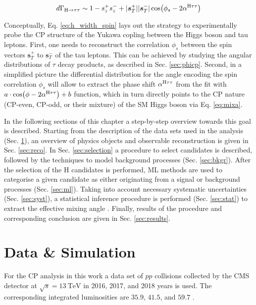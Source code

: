 \begin{equation}\label{eq:h_width_spin}
    d\Gamma_{\text{H} \rightarrow \tau\tau} \sim 1 - s^+_zs^-_z + |\boldsymbol{s}_T^+||\boldsymbol{s}_T^-|\cos(\phi_{s}-2\alpha^{\text{H}\tau\tau})
\end{equation}

Conceptually, Eq. \ref{eq:h_width_spin} lays out the strategy to experimentally probe the CP structure of the Yukawa copling between the Higgs boson and tau leptons. First, one needs to reconstruct the correlation $\phi_{s}$ between the spin vectors $\boldsymbol{s}_T^+$ to $\boldsymbol{s}_T^-$ of the tau leptons. This can be achieved by studying the angular distributions of $\tau$ decay products, as described in Sec. \ref{sec:phicp}. Second, in a simplified picture the differential distribution for the angle encoding the spin correlation $\phi_{s}$ will allow to extract the phase shift $\alpha^{\text{H}\tau\tau}$ from the fit with $a\cdot\cos(\phi - 2\alpha^{\text{H}\tau\tau})+b$ function, which in turn directly points to the CP nature (CP-even, CP-odd, or their mixture) of the SM Higgs boson via Eq. \ref{eq:mixa}. 

In the following sections of this chapter a step-by-step overview towards this goal is described. Starting from the description of the data sets used in the analysis (Sec. \ref{sec:samples}), an overview of physics objects and observable reconstruction is given in Sec. \ref{sec:reco}. In Sec. \ref{sec:selection} a procedure to select \htt candidates is described, followed by the techniques to model background processes (Sec. \ref{sec:bkgr}). After the selection of the H candidates is performed, ML methods are used to categorise a given candidate as either originating from a signal or background processes (Sec. \ref{sec:ml}). Taking into account necessary systematic uncertainties (Sec. \ref{sec:syst}), a statistical inference procedure is performed (Sec. \ref{sec:stat}) to extract the effective mixing angle \mixa. Finally, results of the procedure and corresponding conclusion are given in Sec. \ref{sec:results}. 

\section{Data \& Simulation}\label{sec:samples}
For the CP analysis in this work a data set of $pp$ collisions collected by the CMS detector at $\sqrt{s}=13~\text{TeV}$ in 2016, 2017, and 2018 years is used. The corresponding integrated luminosities are $35.9$, $41.5$, and $59.7$ \fbi.


